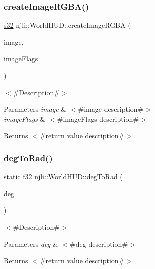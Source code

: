 \subsubsection{\texorpdfstring{create\+Image\+R\+G\+B\+A()}{createImageRGBA()}}
{\footnotesize\ttfamily \mbox{\hyperlink{_util_8h_aa62c75d314a0d1f37f79c4b73b2292e2}{s32}} njli\+::\+World\+H\+U\+D\+::create\+Image\+R\+G\+BA (\begin{DoxyParamCaption}\item[{const \mbox{\hyperlink{classnjli_1_1_image}{Image}} \&}]{image,  }\item[{\mbox{\hyperlink{namespacenjli_a3c5203f27f547353dd9e29345d747b14}{njli\+H\+U\+D\+Image\+Flags}}}]{image\+Flags }\end{DoxyParamCaption})}

$<$\#\+Description\#$>$


\begin{DoxyParams}{Parameters}
{\em image} & $<$\#image description\#$>$ \\
\hline
{\em image\+Flags} & $<$\#image\+Flags description\#$>$\\
\hline
\end{DoxyParams}
\begin{DoxyReturn}{Returns}
$<$\#return value description\#$>$ 
\end{DoxyReturn}
\mbox{\label{classnjli_1_1_world_h_u_d_a2b5ee48baf5aabe897cfc96d39927749}} 
\subsubsection{\texorpdfstring{deg\+To\+Rad()}{degToRad()}}
{\footnotesize\ttfamily static \mbox{\hyperlink{_util_8h_a5f6906312a689f27d70e9d086649d3fd}{f32}} njli\+::\+World\+H\+U\+D\+::deg\+To\+Rad (\begin{DoxyParamCaption}\item[{\mbox{\hyperlink{_util_8h_a5f6906312a689f27d70e9d086649d3fd}{f32}}}]{deg }\end{DoxyParamCaption})\hspace{0.3cm}{\ttfamily [static]}}

$<$\#\+Description\#$>$


\begin{DoxyParams}{Parameters}
{\em deg} & $<$\#deg description\#$>$\\
\hline
\end{DoxyParams}
\begin{DoxyReturn}{Returns}
$<$\#return value description\#$>$ 
\end{DoxyReturn}
\mbox{\label{classnjli_1_1_world_h_u_d_ade08fde0f318b4ffad0ce0345cd34396}} 
